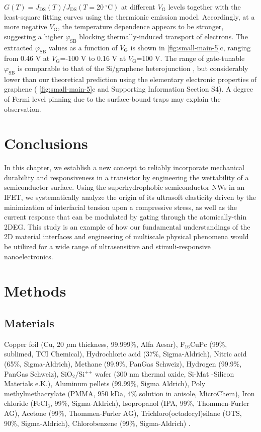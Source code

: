 \(G(T)=J_{\mathrm{DS}}(T)/J_{\mathrm{DS}}(T=20\ ^{\circ} \mathrm{C})\)
at different \(V_{\mathrm{G}}\) levels together with the least-square
fitting curves using the thermionic emission model. Accordingly, at a
more negative \(V_{\mathrm{G}}\), the temperature dependence appears
to be stronger, suggesting a higher \(\varphi_{\mathrm{SB}}\) blocking
thermally-induced transport of electrons. The extracted
\(\varphi_{\mathrm{SB}}\) values as a function of \(V_{\mathrm{G}}\)
is shown in \autoref{fig:small-main-5}c, ranging from 0.46 V at
\(V_{\mathrm{G}}\)=-100 V to 0.16 V at \(V_{\mathrm{G}}\)=100 V.  The
range of gate-tunable \(\varphi_{\mathrm{SB}}\) is comparable to that
of the Si/graphene heterojunction \cite{Yang_2012_Barristor}, but
considerably lower than our theoretical prediction using the
elementary electronic properties of graphene (
\autoref{fig:small-main-5}c and Supporting Information Section S4). A
degree of Fermi level pinning due to the surface-bound traps
\cite{Meric_2008_saturation_gr_FET} may explain the observation.

\section{Conclusions}
\label{sec:small-conclusions}

In this chapter, we establish a new concept to reliably incorporate
mechanical durability and responsiveness in a transistor by
engineering the wettability of a semiconductor surface. Using the
superhydrophobic semiconductor NWs in an IFET, we systematically
analyze the origin of its ultrasoft elasticity driven by the
minimization of interfacial tension upon a compressive stress, as well
as the current response that can be modulated by gating through the
atomically-thin 2DEG.
%
This study is an example of how our fundamental understandings of the
2D material interfaces and engineering of multiscale physical
phenomena would be utilized for a wide range of ultrasensitive and
stimuli-responsive nano\-electronics.




\section{Methods}
\label{sec:small-method}

\subsection*{Materials}
\label{sec:small-org2cee247}
Copper foil (Cu, 20 \(\mu \mathrm{m}\) thickness, 99.999\%, Alfa Aesar),
F\(_{\text{16}}\)CuPc (99\%, sublimed, TCI Chemical), Hydrochloric acid (37\%,
Sigma-Aldrich), Nitric acid (65\%, Sigma-Aldrich), Methane (99.9\%,
PanGas Schweiz), Hydrogen (99.9\%, PanGas Schweiz), SiO\(_{\text{2}}\)/Si\(^{\text{++}}\)
wafer (300 nm thermal oxide, Si-Mat -Silicon Materials e.K.), Aluminum
pellets (99.99\%, Sigma Aldrich), Poly methylmethacrylate (PMMA, 950
kDa, 4\% solution in anisole, MicroChem), Iron chloride (FeCl\(_{\text{3}}\), 99\%,
Sigma-Aldrich), Isopropanol (IPA, 99\%, Thommen-Furler AG), Acetone
(99\%, Thommen-Furler AG), Trichloro(octadecyl)silane (OTS, 90\%,
Sigma-Aldrich), Chlorobenzene (99\%, Sigma-Aldrich) .

